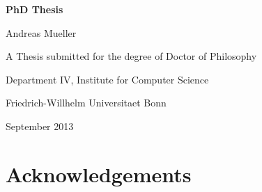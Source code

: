 \documentclass[12pt,toc=bibnumbered, a4paper,twoside]{scrreprt}
\begin{document}


\begin{titlepage}
\begin{center}
\vspace*{1in}
\textbf{{\LARGE PhD Thesis}}
\par
\vspace{1.5in} {\large Andreas Mueller}
 \par \vfill A Thesis submitted for the degree of Doctor of Philosophy
\par \vspace{0.5in}
Department IV, Institute for Computer Science
\par \vspace{0.5in}
Friedrich-Willhelm Universitaet Bonn \par
\vspace{0.5in} September 2013 \end{center}

\end{titlepage}

\tableofcontents
\listoffigures
\listoftables
 \chapter*{Acknowledgements}
 \begin{abstract} abstract
\end{abstract}


\end{document}
